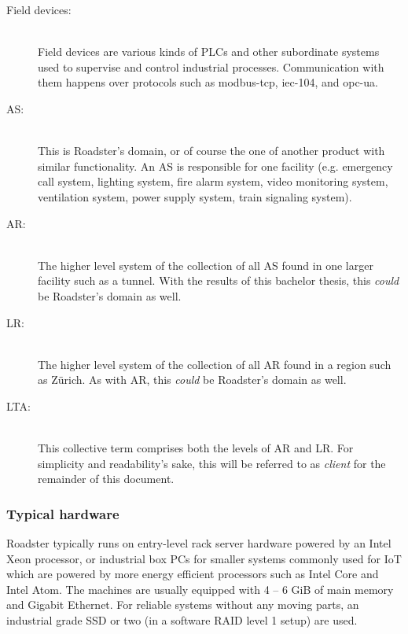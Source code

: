 \begin{description}
	\item [ Field devices: ] \hfill\\
	Field devices are various kinds of \glspl{PLC} and other subordinate systems
	used to supervise and control industrial processes. Communication with them
	happens over protocols such as \gls{modbus-tcp}, \gls{iec-104}, and
	\gls{opc-ua}.

	\item [ \gls{AS}: ] \hfill\\
	This is Roadster's domain, or of course the one of another product with similar
	functionality. An AS is responsible for one facility (e.g. emergency call system,
	lighting system, fire alarm system, video monitoring system, ventilation
	system, power supply system, train signaling system).

	\item [ \gls{AR}: ] \hfill\\
	The higher level system of the collection of all AS found in one larger
	facility such as a tunnel. With the results of this bachelor thesis, this
	\emph{could} be Roadster's domain as well.

	\item [ \gls{LR}: ] \hfill\\
	The higher level system of the collection of all AR found in a region such as
	Z\"urich. As with AR, this \emph{could} be Roadster's domain as well.

	\item [ \gls{LTA}: ] \hfill\\
	This collective term comprises both the levels of AR and LR. For
	simplicity and readability's sake, this will be referred to as
	\emph{client} for the remainder of this document.
\end{description}

\subsubsection{Typical hardware}
Roadster typically runs on entry-level rack server hardware powered by an
Intel\textregistered{} Xeon\textregistered{} processor, or industrial box PCs for smaller systems
commonly used for \gls{IoT} which are powered by more energy efficient processors
such as Intel\textregistered{} Core\textregistered{} and Intel\textregistered{}
Atom\texttrademark{}. The machines are usually equipped with 4 -- 6 GiB of main
memory and Gigabit Ethernet. For reliable systems without any moving parts, an
industrial grade \gls{SSD} or two (in a software \gls{RAID} level 1 setup) are used.

